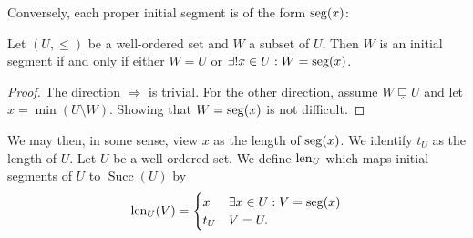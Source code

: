 Conversely, each proper initial segment is of the form $\operatorname{seg}(x)$:
\begin{proposition}
Let $(U,\leq)$ be a well-ordered set and $W$ a subset of $U$. Then $W$ is an initial segment \textup{if and only if} either $W=U$ or $\exists! x\in U: W = \operatorname{seg}(x)$.
\end{proposition}
\begin{proof}
The direction $\Rightarrow$ is trivial. For the other direction, assume $W \sqsubsetneq U$ and let $x= \min(U\setminus W)$. Showing that $W=\operatorname{seg}(x)$ is not difficult.
\end{proof}
We may then, in some sense, view $x$ as the length of $\operatorname{seg}(x)$. We identify $t_U$ as the length of $U$. Let $U$ be a well-ordered set. We define $\operatorname{len}_U$ which maps initial segments of $U$ to $\operatorname{Succ}(U)$ by
\[ \operatorname{len}_U(V) = \begin{cases}
x & \exists x\in U: V=\operatorname{seg}(x) \\
t_U & V = U.
\end{cases} \]

